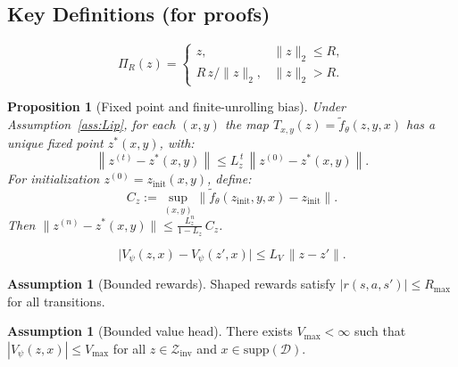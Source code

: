 \documentclass{article}
\theoremstyle{plain}
\newtheorem{proposition}[theorem]{Proposition}
\theoremstyle{definition}
\newtheorem{assumption}[theorem]{Assumption}
\theoremstyle{remark}
\newcommand{\shortonly}[1]{#1}
\newcommand{\shortonly}[1]{}
\newcommand{\norm}[1]{\left\lVert #1 \right\rVert}
\begin{document}
\shortonly{%
\subsection*{Key Definitions (for proofs)}

\begin{equation}
\Pi_R(z) =
\begin{cases}
z, & \|z\|_2 \le R,\\
R\,z/\|z\|_2, & \|z\|_2 > R.
\end{cases}
\label{eq:projection}
\end{equation}

\begin{proposition}[Fixed point and finite-unrolling bias]
\label{prop:banach}
Under Assumption~\ref{ass:Lip}, for each $(x,y)$ the map $T_{x,y}(z)=\tilde f_\theta(z,y,x)$ has a unique fixed point $z^*(x,y)$, with:
\begin{equation}
\norm{z^{(t)} - z^*(x,y)} \le L_z^{\,t}\,\norm{z^{(0)} - z^*(x,y)}.
\label{eq:linear_convergence}
\end{equation}
For initialization $z^{(0)} = z_{\mathrm{init}}(x,y)$, define:
\begin{equation}
C_z:=\sup_{(x,y)}\bigl\|\tilde f_\theta(z_{\mathrm{init}},y,x)-z_{\mathrm{init}}\bigr\|.
\label{eq:Cz_def}
\end{equation}
Then $\|z^{(n)}-z^*(x,y)\| \le \frac{L_z^n}{1-L_z}\,C_z$.
\end{proposition}

\begin{equation}
\bigl|V_\psi(z,x)-V_\psi(z',x)\bigr| \le L_V\,\|z-z'\|.
\label{eq:LV_def}
\end{equation}

\begin{assumption}[Bounded rewards]
\label{ass:bounded}
Shaped rewards satisfy $|r(s,a,s')|\le R_{\max}$ for all transitions.
\end{assumption}

\begin{assumption}[Bounded value head]
\label{ass:bounded_value_head}
There exists $V_{\max}<\infty$ such that $|V_\psi(z,x)| \le V_{\max}$ for all $z\in\mathcal{Z}_{\mathrm{inv}}$ and $x \in \mathrm{supp}(\mathcal{D})$.
\end{assumption}

}
\end{document}

